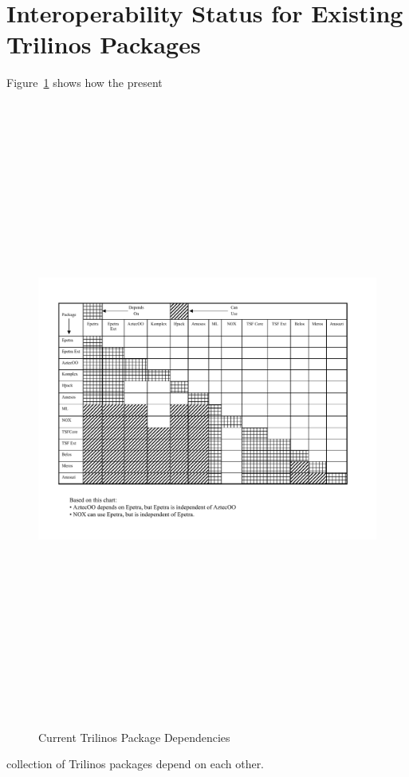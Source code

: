 \documentclass[12pt,relax]{TrilinosDevGuide}
\begin{document}
\section{Interoperability Status for Existing Trilinos Packages}
Figure~\ref{Figure:TrilinosPackageDependencies} shows how the present
\begin{figure}
\includegraphics[height=8in]{TrilinosPackageDependencies}
\label{Figure:TrilinosPackageDependencies}
\caption{Current Trilinos Package Dependencies}
\end{figure}
collection of Trilinos packages depend on each other.

\end{document}
